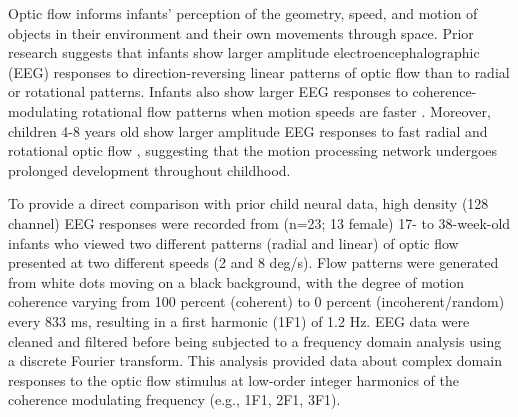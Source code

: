 \documentclass[landscape,final,paperwidth=48in,paperheight=33in,fontscale=0.285]{baposter}
\begin{document}
\begin{poster}
%
    {
    Optic flow informs infants' perception of the geometry, speed, and motion of objects in their environment and their own movements through space. Prior research suggests that infants show larger amplitude electroencephalographic (EEG) responses to direction-reversing linear patterns of optic flow \cite{Gilmore2007-od} than to radial or rotational patterns. Infants also show larger EEG responses to coherence-modulating rotational flow patterns when motion speeds are faster \cite{Hou2009-iz}. Moreover, children 4-8 years old show larger amplitude EEG responses to fast radial and rotational optic flow \cite{Gilmore2016-sd}, suggesting that the motion processing network undergoes prolonged development throughout childhood.
    }
    {
\par To provide a direct comparison with prior child neural data, high density (128 channel) EEG responses were recorded from (n=23; 13 female) 17- to 38-week-old infants who viewed two different patterns (radial and linear) of optic flow presented at two different speeds (2 and 8 deg/s). Flow patterns were generated from white dots moving on a black background, with the degree of motion coherence varying from 100 percent (coherent) to 0 percent (incoherent/random) every 833 ms, resulting in a first harmonic (1F1) of 1.2 Hz. EEG data were cleaned and filtered before being subjected to a frequency domain analysis using a discrete Fourier transform. This analysis provided data about complex domain responses to the optic flow stimulus at low-order integer harmonics of the coherence modulating frequency (e.g., 1F1, 2F1, 3F1).
    }
    {
\begin{center}


\end{center}}
\end{poster}
\end{document}
